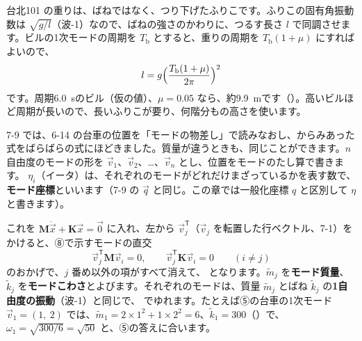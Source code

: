 台北101 の重りは、ばねではなく、つり下げたふりこです。ふりこの固有角振動数は $\sqrt{g/l}$（波-1）なので、ばねの強さのかわりに、つるす長さ $l$ で同調させます。ビルの1次モードの周期を $T_{\mathrm b}$ とすると、重りの周期を $T_{\mathrm b}(1+\mu)$ にすればよいので、
\[l=g\Bigl(\frac{T_{\mathrm b}(1+\mu)}{2\pi}\Bigr)^2\]
です。周期\qty{6.0}{s}のビル（仮の値）、$\mu=0.05$ なら、約\qty{9.9}{m}です（）。高いビルほど周期が長いので、長いふりこが要り、何階分もの高さを使います。

\begin{phmodel}[2自由度の動吸振器]
\end{phmodel}

\label{ph:波-3:sec7}
7-9 では、6-14 の台車の位置を「モードの物差し」で読みなおし、からみあった式をばらばらの式にほどきました。質量が違うときも、同じことができます。$n$ 自由度のモードの形を $\vec v_1$、$\vec v_2$、…、$\vec v_n$ とし、位置をモードのたし算で書きます。
$\eta_i$（イータ）は、それぞれのモードがどれだけまざっているかを表す数で、\textbf{モード座標}といいます（7-9 の $\vec q$ と同じ。この章では一般化座標 $q$ と区別して $\eta$ と書きます）。

これを $\mathbf M\ddot{\vec x}+\mathbf K\vec x=\vec 0$ に入れ、左から $\vec v_j^{\mathsf T}$（$\vec v_j$ を転置した行ベクトル、7-1）をかけると、⑧で示すモードの直交
\[\vec v_j^{\mathsf T}\mathbf M\vec v_i=0,\qquad\vec v_j^{\mathsf T}\mathbf K\vec v_i=0\qquad(i\neq j)\]
のおかげで、$j$ 番め以外の項がすべて消えて、
となります。$\tilde m_j$ を\textbf{モード質量}、$\tilde k_j$ を\textbf{モードこわさ}とよびます。それぞれのモードは、質量 $\tilde m_j$ とばね $\tilde k_j$ の\textbf{1自由度の振動}（波-1）と同じで、
でゆれます。たとえば⑤の台車の1次モード $\vec v_1=(1,\ 2)$ では、$\tilde m_1=2\times1^2+1\times2^2=6$、$\tilde k_1=300$（）で、$\omega_1=\sqrt{300/6}=\sqrt{50}$ と、⑤の答えに合います。

